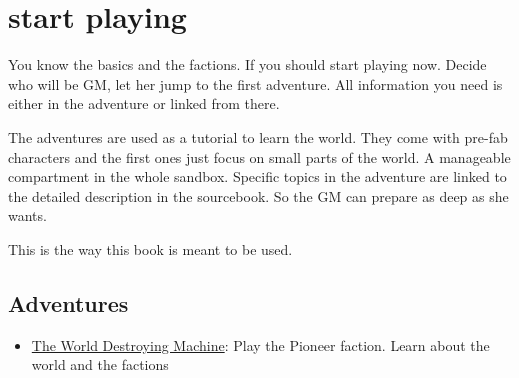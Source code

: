 \section{start playing}

You know the basics and the factions. If you should start playing now. Decide who will be GM, let her jump to the first adventure.
All information you need is either in the adventure or linked from there.

The adventures are used as a tutorial to learn the world. They come with pre-fab characters and the first ones just focus on small parts of the world. A manageable compartment in the whole sandbox.
Specific topics in the adventure are linked to the detailed description in the sourcebook. So the GM can prepare as deep as she wants.

This is the way this book is meant to be used.

\subsection{Adventures}

\begin{itemize}
\item \hyperref[ch:the world destroying machine]{The World Destroying Machine}: Play the Pioneer faction. Learn about the world and the factions
\end{itemize}